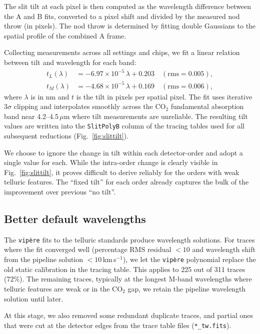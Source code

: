 \documentclass{aa}
\newcommand{\um}{$\mu$m}
\newcommand{\kms}{km\,s$^{-1}$}
\newcommand{\vipere}{\texttt{vip\`ere}}
\begin{document}
The slit tilt at each pixel is then computed as the wavelength difference
between the A and B fits, converted to a pixel shift and divided by the
measured nod throw (in pixels). The nod throw is determined by fitting
double Gaussians to the spatial profile of the combined A frame.

Collecting measurements across all settings and chips, we fit a linear
relation between tilt and wavelength for each band:
\begin{align}
  t_L(\lambda) &= -6.97 \times 10^{-5}\,\lambda + 0.203 \quad
    (\mathrm{rms} = 0.005), \label{eq:tiltL} \\
  t_M(\lambda) &= -4.68 \times 10^{-5}\,\lambda + 0.169 \quad
    (\mathrm{rms} = 0.006), \label{eq:tiltM}
\end{align}
where $\lambda$ is in nm and $t$ is the tilt in pixels per spatial pixel.
The fit uses iterative 3$\sigma$ clipping and interpolates smoothly
across the CO$_2$ fundamental absorption band near 4.2--4.5\,\um{} where
tilt measurements are unreliable. The resulting tilt values are written
into the \texttt{SlitPolyB} column of the tracing tables used for all
subsequent reductions (Fig.~\ref{fig:slittilt}).

We choose to ignore the change in tilt within each detector-order
and adopt a single value for each. While the intra-order change is clearly
visible in Fig.~\ref{fig:slittilt}, it proves difficult to derive reliably for
the orders with weak telluric features. The ``fixed tilt'' for each
order already captures the bulk of the improvement over previous 
``no tilt''.

\subsection{Better default wavelengths}
\label{sec:defaultwave}

The \vipere{} fits to the telluric standards produce
wavelength solutions. For traces where the fit converged well
(percentage RMS residual $< 10$ and wavelength shift from the pipeline
solution $< 10$\,\kms), we let the \vipere{} polynomial replace the old static
 calibration in the tracing table. This applies to 225 out of
311 traces (72\%). The remaining traces, typically at the longest M-band
wavelengths where telluric features are weak or in the CO$_2$ gap, we retain
the pipeline wavelength solution until later.

At this stage, we also removed some redundant duplicate traces, and partial ones
that were cut at the detector edges from the trace table files (\texttt{*\_tw.fits}).
\end{document}
